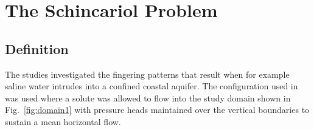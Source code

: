 \newcommand{\bg}[1]{\ensuremath{\boldsymbol{#1}}} 

\section{The Schincariol Problem}

%
% 

\subsection{Definition}
The studies investigated the fingering patterns that result when for example saline water intrudes into a confined coastal aquifer. The configuration used in \cite{schinca1} was used where a solute was allowed to flow into the study domain shown in Fig.\ \ref{fig:domain1} with pressure heads maintained over the vertical boundaries to sustain a mean horizontal flow.


